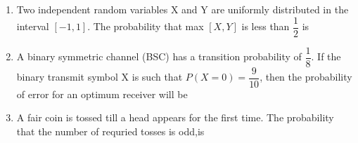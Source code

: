 \documentclass[journal,12pt,twocolumn]{IEEEtran}
\begin{document}
\begin{enumerate}
\item Two independent random variables X and Y are uniformly distributed in the interval $[-1,1]$. The probability that max $[X,Y]$ is less than $\dfrac{1}{2}$ is
\begin{enumerate}
\end{enumerate}

\item A binary symmetric channel (BSC) has a transition probability of $\dfrac{1}{8}$. If the binary transmit symbol X is such that $P(X=0)=\dfrac{9}{10}$, then the probability of error for an optimum receiver will be
\begin{enumerate}
\end{enumerate}
\solution

\item A fair coin is tossed till a head appears for the first time. The probability that the number of requried tosses is odd,is
\begin{enumerate}
\end{enumerate}
\solution



\end{enumerate}
\end{document}
